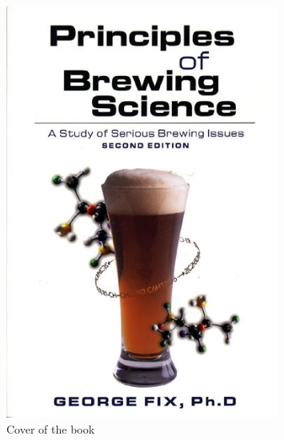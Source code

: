\begin{figure}
\begin{center}
\includegraphics[width=0.8\textwidth]{images/bookcover}
\end{center}
\caption{Cover of the book}
\label{fig:bookcover}
\end{figure}

